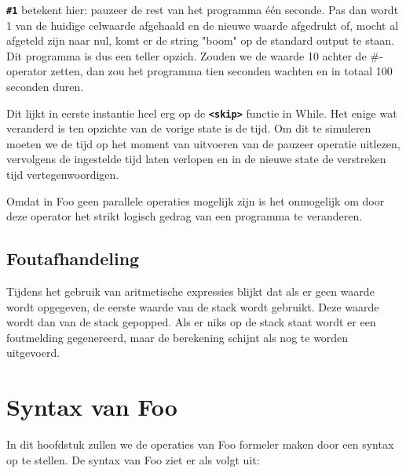 \documentclass[11pt]{article}
\begin{document}
{\bf \verb|#1|} betekent hier: pauzeer de rest van het programma \'e\'en seconde. 
Pas dan wordt 1 van de huidige celwaarde afgehaald en de nieuwe waarde afgedrukt of, mocht al afgeteld zijn naar nul, komt er de string "boom" op de standard output te staan.
Dit programma is dus een teller opzich.
Zouden we de waarde 10 achter de \#-operator zetten, dan zou het programma tien seconden wachten en in totaal 100 seconden duren.


Dit lijkt in eerste instantie heel erg op de {\bf\verb|<skip>|} functie in While.
Het enige wat veranderd is ten opzichte van de vorige state is de tijd.
Om dit te simuleren moeten we de tijd op het moment van uitvoeren van de pauzeer operatie uitlezen, vervolgens de ingestelde tijd laten verlopen en in de nieuwe state de verstreken tijd vertegenwoordigen.

Omdat in Foo geen parallele operaties mogelijk zijn is het onmogelijk om door deze operator het strikt logisch gedrag van een programma te veranderen.

\subsection{Foutafhandeling} %

Tijdens het gebruik van aritmetische expressies blijkt dat als er geen waarde wordt opgegeven, de eerste waarde van de stack wordt gebruikt. 
Deze waarde wordt dan van de stack gepopped. 
Als er niks op de stack staat wordt er een foutmelding gegenereerd, maar de berekening schijnt als nog te worden uitgevoerd.

\section{Syntax van Foo}
In dit hoofdstuk zullen we de operaties van Foo formeler maken door een syntax op te stellen. 
De syntax van Foo ziet er als volgt uit:
\newline
\end{document}
